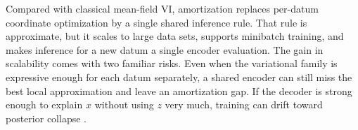 Compared with classical mean-field VI, amortization replaces per-datum coordinate optimization by a single shared inference rule.
That rule is approximate, but it scales to large data sets, supports minibatch training, and makes inference for a new datum a single encoder evaluation.
The gain in scalability comes with two familiar risks.
Even when the variational family is expressive enough for each datum separately, a shared encoder can still miss the best local approximation and leave an amortization gap.
If the decoder is strong enough to explain \(x\) without using \(z\) very much, training can drift toward posterior collapse \citep[\S\S3--4]{he_spokoyny_neubig_bergkirkpatrick_2019_lagging_inference}.
